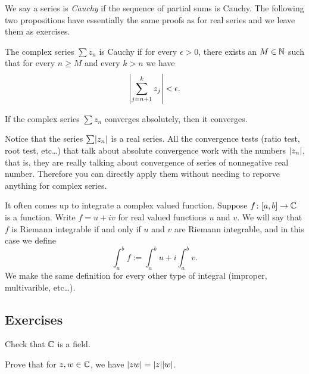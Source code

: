 We say a series
is \emph{Cauchy}
if the sequence of partial sums is Cauchy.  The following two
propositions have essentially the same proofs as for real series and we
leave them as exercises.

\begin{prop} \label{prop:cachysercomplex}
The complex series $\sum z_n$ is Cauchy if for every $\epsilon > 0$, 
there exists an $M \in {\mathbb{N}}$ such that for every $n \geq M$
and every $k > n$ we have
\begin{equation*}
\left\lvert { \sum_{j={n+1}}^k z_j } \right\rvert
< \epsilon .
\end{equation*}
\end{prop}

\begin{prop} \label{prop:absconvmeansconv}
If the complex series $\sum z_n$ converges absolutely, then it converges.
\end{prop}

Notice that the series $\sum \lvert {z_n} \rvert$ is a real series.  All the
convergence tests (ratio test, root test, etc\ldots) that talk about
absolute convergence work with the numbers $\lvert {z_n} \rvert$, that is, they
are really talking about convergence of series of nonnegative real
number.
Therefore you
can directly apply them without needing to reporve anything for complex
series.

\medskip

It often comes up to integrate a complex valued function.  Suppose
$f \colon [a,b] \to {\mathbb{C}}$ is a function.  Write
$f = u+iv$ for real valued functions $u$ and $v$.  We will say
that $f$ is Riemann integrable if and only if $u$ and $v$ are Riemann
integrable, and in this case we define
\begin{equation*}
\int_a^b f := \int_a^b u + i \int_a^b v .
\end{equation*}
We make the same definition for every other type of integral (improper,
multivarible, etc\ldots).

\subsection{Exercises}

\begin{exercise}
Check that ${\mathbb{C}}$ is a field.
\end{exercise}

\begin{exercise}
Prove that for $z,w \in {\mathbb{C}}$, we have
$\lvert {zw} \rvert = \lvert {z} \rvert \lvert {w} \rvert$.
\end{exercise}

